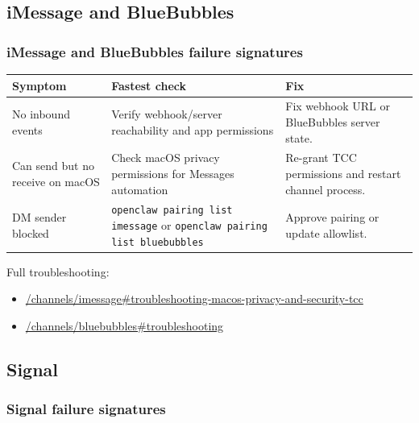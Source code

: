 \subsection{iMessage and BlueBubbles}


\subsubsection{iMessage and BlueBubbles failure signatures}



\begin{table}[h]
\centering
\small
\begin{tabular}{|l|l|l|}
\hline
Symptom & Fastest check & Fix \\
\hline
No inbound events & Verify webhook/server reachability and app permissions & Fix webhook URL or BlueBubbles server state. \\
\hline
Can send but no receive on macOS & Check macOS privacy permissions for Messages automation & Re-grant TCC permissions and restart channel process. \\
\hline
DM sender blocked & \texttt{openclaw pairing list imessage} or \texttt{openclaw pairing list bluebubbles} & Approve pairing or update allowlist. \\
\hline
\end{tabular}
\end{table}



Full troubleshooting:

\begin{itemize}
  \item \href{/channels/imessage\#troubleshooting-macos-privacy-and-security-tcc}{/channels/imessage\#troubleshooting-macos-privacy-and-security-tcc}
  \item \href{/channels/bluebubbles\#troubleshooting}{/channels/bluebubbles\#troubleshooting}
\end{itemize}


\subsection{Signal}


\subsubsection{Signal failure signatures}



